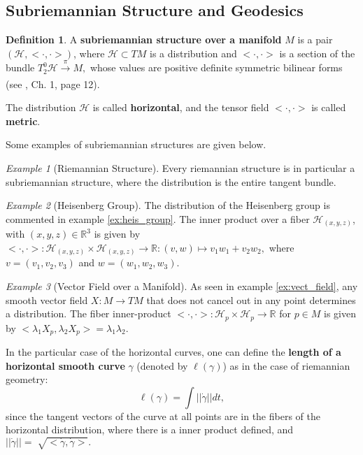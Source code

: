 \documentclass[12pt, letterpaper, reqno]{amsart}
\theoremstyle{definition}
\newtheorem{df}{Definition}
\theoremstyle{plain}
\theoremstyle{remark}
\newtheorem{ex}{Example}
\begin{document}
\subsection{Subriemannian Structure and Geodesics}%
\label{sub:subriemannian_structure_and_geodesics}
\begin{df}
	A \textbf{subriemannian structure over a manifold} $ M $ is a pair $ (\mathcal{H}, <\cdot,\cdot>)$, where $ \mathcal{H}\subset TM $ is a distribution and $ <\cdot,\cdot> $ is a section of the bundle $ T^0_2 \mathcal{H} \xrightarrow[]{\pi} M, $ whose values are positive definite symmetric bilinear forms (see \cite{hatcher2003vector}, Ch. 1, page 12).

	The distribution $ \mathcal{H} $ is called \textbf{horizontal}, and the tensor field $ <\cdot,\cdot> $ is called \textbf{metric}.  
\end{df}

Some examples of subriemannian structures are given below.
\begin{ex}[Riemannian Structure]\label{ex:riem_geo2}
	Every riemannian structure is in particular a subriemannian structure, where the distribution is the entire tangent bundle.
\end{ex}

\begin{ex}[Heisenberg Group]\label{ex:heis_group2}
	The distribution of the Heisenberg group is commented in example \ref{ex:heis_group}. The inner product over a fiber $ \mathcal{H}_{(x,y,z)} $, with $ (x,y,z)\in \mathbb{R}^3 $  is given by $<\cdot,\cdot>:  \mathcal{H}_{(x,y,z)}\times\mathcal{H}_{(x,y,z)} \rightarrow { \mathbb{R} }:(v,w)\mapsto v_1w_1+v_2w_2,$ where $ v=(v_1,v_2,v_3) $ and $ w=(w_1,w_2,w_3). $  

\end{ex}
\begin{ex}[Vector Field over a Manifold]\label{ex:vect_field2}
	As seen in example \ref{ex:vect_field}, any smooth vector field $ X: M \rightarrow TM$ that does not cancel out in any point determines a distribution.  The fiber inner-product $ <\cdot,\cdot>: \mathcal{H}_p \times \mathcal{H}_p \rightarrow \mathbb{R} $ for $ p\in M $  is given by $<\lambda_1 X_p,\lambda_2 X_p>=\lambda_1 \lambda_2.$
\end{ex}
In the particular case of the horizontal curves, one can define the \textbf{length of a horizontal smooth curve} $ \gamma $ (denoted by $ \ell(\gamma) $) as in the case of riemannian geometry:
$$ \ell(\gamma) = \int ||\dot{\gamma}|| dt, $$ 
since the tangent vectors of the curve at all points are in the fibers of the horizontal distribution, where there is a inner product defined, and $ ||\dot{\gamma}||= \sqrt[]{<\dot{\gamma}, \dot{\gamma}>}.  $   
\end{document}
